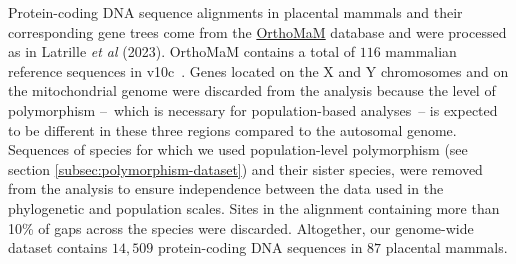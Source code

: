 \documentclass[12pt]{article}
\begin{document}
    Protein-coding DNA sequence alignments in placental mammals and their corresponding gene trees come from the \href{https://www.orthomam.univ-montp2.fr}{OrthoMaM} database and were processed as in Latrille \textit{et al} (2023)\cite{latrille_genes_2023}.
    OrthoMaM contains a total of $116$ mammalian reference sequences in v10c~\cite{ranwez_orthomam_2007, douzery_orthomam_2014, scornavacca_orthomam_2019}.
    Genes located on the X and Y chromosomes and on the mitochondrial genome were discarded from the analysis because the level of polymorphism –~which is necessary for population-based analyses~– is expected to be different in these three regions compared to the autosomal genome.
    Sequences of species for which we used population-level polymorphism (see section \ref{subsec:polymorphism-dataset}) and their sister species, were removed from the analysis to ensure independence between the data used in the phylogenetic and population scales.
    Sites in the alignment containing more than 10\% of gaps across the species were discarded.
    Altogether, our genome-wide dataset contains $14,509$ protein-coding DNA sequences in $87$ placental mammals.
\end{document}
